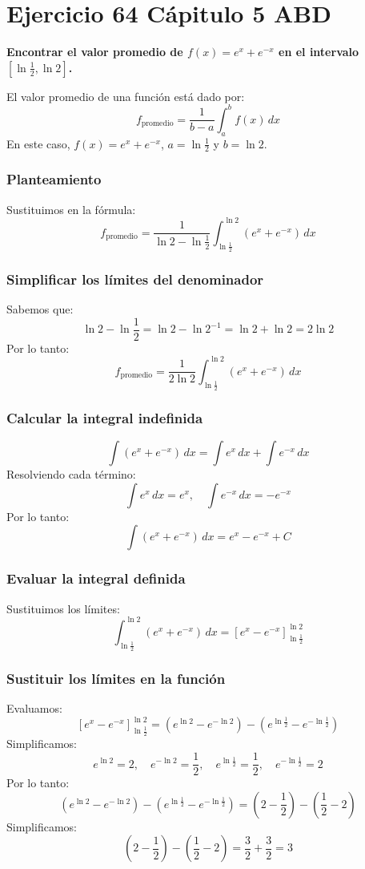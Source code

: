 \chapter*{Ejercicio 64 Cápitulo 5 ABD}
\textbf{Encontrar el valor promedio de \( f(x) = e^x + e^{-x} \) en el intervalo \([ \ln \frac{1}{2}, \ln 2 ]\).}

El valor promedio de una función está dado por:
\[
f_{\text{promedio}} = \frac{1}{b-a} \int_{a}^{b} f(x) \, dx
\]
En este caso, \( f(x) = e^x + e^{-x} \), \( a = \ln \frac{1}{2} \) y \( b = \ln 2 \).

\subsection*{Planteamiento}
Sustituimos en la fórmula:
\[
f_{\text{promedio}} = \frac{1}{\ln 2 - \ln \frac{1}{2}} \int_{\ln \frac{1}{2}}^{\ln 2} (e^x + e^{-x}) \, dx
\]

\subsection*{Simplificar los límites del denominador}
Sabemos que:
\[
\ln 2 - \ln \frac{1}{2} = \ln 2 - \ln 2^{-1} = \ln 2 + \ln 2 = 2 \ln 2
\]
Por lo tanto:
\[
f_{\text{promedio}} = \frac{1}{2 \ln 2} \int_{\ln \frac{1}{2}}^{\ln 2} (e^x + e^{-x}) \, dx
\]

\subsection*{Calcular la integral indefinida}
\[
\int (e^x + e^{-x}) \, dx = \int e^x \, dx + \int e^{-x} \, dx
\]
Resolviendo cada término:
\[
\int e^x \, dx = e^x, \quad \int e^{-x} \, dx = -e^{-x}
\]
Por lo tanto:
\[
\int (e^x + e^{-x}) \, dx = e^x - e^{-x} + C
\]

\subsection*{Evaluar la integral definida}
Sustituimos los límites:
\[
\int_{\ln \frac{1}{2}}^{\ln 2} (e^x + e^{-x}) \, dx = \left[ e^x - e^{-x} \right]_{\ln \frac{1}{2}}^{\ln 2}
\]

\subsection*{Sustituir los límites en la función}
Evaluamos:
\[
\left[ e^x - e^{-x} \right]_{\ln \frac{1}{2}}^{\ln 2} = \left( e^{\ln 2} - e^{-\ln 2} \right) - \left( e^{\ln \frac{1}{2}} - e^{-\ln \frac{1}{2}} \right)
\]
Simplificamos:
\[
e^{\ln 2} = 2, \quad e^{-\ln 2} = \frac{1}{2}, \quad e^{\ln \frac{1}{2}} = \frac{1}{2}, \quad e^{-\ln \frac{1}{2}} = 2
\]
Por lo tanto:
\[
\left( e^{\ln 2} - e^{-\ln 2} \right) - \left( e^{\ln \frac{1}{2}} - e^{-\ln \frac{1}{2}} \right) = \left( 2 - \frac{1}{2} \right) - \left( \frac{1}{2} - 2 \right)
\]
Simplificamos:
\[
\left( 2 - \frac{1}{2} \right) - \left( \frac{1}{2} - 2 \right) = \frac{3}{2} + \frac{3}{2} = 3
\]

